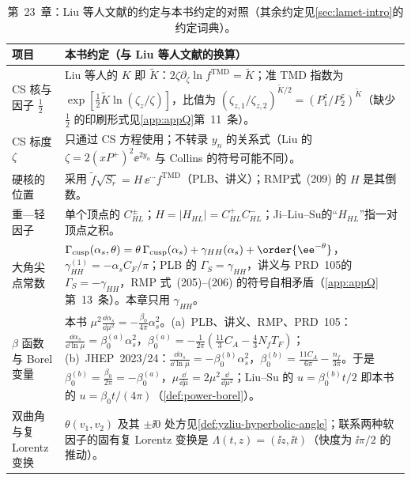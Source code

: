 \begin{table}[htbp]
\centering
\footnotesize
\renewcommand{\arraystretch}{1.1}
\begin{tabularx}{\textwidth}{@{}>{\raggedright\arraybackslash}p{2.0cm}>{\raggedright\arraybackslash}X@{}}
\toprule
项目 & 本书约定（与 Liu 等人文献的换算） \\
\midrule
CS 核与因子 $\frac12$ & Liu 等人的 $K$ 即 $\tilde K$：$2\zeta\partial_\zeta\ln f^{\mathrm{TMD}}=\tilde K$；准 TMD 指数为 $\exp[\frac12\tilde K\ln(\zeta_z/\zeta)]$，比值为 $(\zeta_{z,1}/\zeta_{z,2})^{\tilde K/2}=(P^z_1/P^z_2)^{\tilde K}$（缺少 $\frac12$ 的印刷形式见\cref{app:appQ}第~11~条）。 \\
CS 标度 $\zeta$ & 只通过 CS 方程使用；不转录 $y_n$ 的关系式（Liu 的 $\zeta=2(xP^+)^2\ee^{2y_n}$ 与 Collins 的符号可能不同）。 \\
硬核的位置 & 采用 $\tilde f\sqrt{S_r}=H\,\ee^{\cdots}f^{\mathrm{TMD}}$（PLB\cite{Ji:2019ewn}、讲义\cite{Liu:2022nnk}）；RMP\cite{JiEtAl2021}式~(209) 的 $H$ 是其倒数。 \\
重—轻因子 & 单个顶点的 $C^\pm_{HL}$；$H=|H_{HL}|=C^+_{HL}C^-_{HL}$；Ji--Liu--Su\cite{Ji:2023pba}的“$H_{HL}$”指一对顶点之积。 \\
大角尖点常数 & $\Gamma_{\mathrm{cusp}}(\alpha_s,\theta)=\theta\,\Gamma_{\mathrm{cusp}}(\alpha_s)+\gamma_{HH}(\alpha_s)+\order{\ee^{-\theta}}$，$\gamma_{HH}^{(1)}=-\alpha_sC_F/\pi$；PLB 的 $\Gamma_S=\gamma_{HH}$，讲义与 PRD~105\cite{Ji:2021znw}的 $\Gamma_S=-\gamma_{HH}$，RMP 式~(205)--(206) 的符号自相矛盾（\cref{app:appQ}第~13~条）。本章只用 $\gamma_{HH}$。 \\
$\beta$ 函数与 Borel 变量 & 本书 $\mu^2\frac{\dd\alpha_s}{\dd\mu^2}=-\frac{\beta_0}{4\pi}\alpha_s^2$。(a)~PLB、讲义、RMP、PRD~105：$\frac{\dd\alpha_s}{\dd\ln\mu}=\beta_0^{(a)}\alpha_s^2$，$\beta_0^{(a)}=-\frac{1}{2\pi}(\frac{11}{3}C_A-\frac43N_fT_F)$；(b)~JHEP~2023/24\cite{Ji:2023pba,Liu:2023onm}：$\frac{\dd\alpha_s}{\dd\ln\mu}=-\beta_0^{(b)}\alpha_s^2$，$\beta_0^{(b)}=\frac{11C_A}{6\pi}-\frac{n_f}{3\pi}$。于是 $\beta_0^{(b)}=\frac{\beta_0}{2\pi}=-\beta_0^{(a)}$，$\mu\frac{\dd}{\dd\mu}=2\mu^2\frac{\dd}{\dd\mu^2}$；Liu--Su 的 $u=\beta_0^{(b)}t/2$ 即本书的 $u=\beta_0t/(4\pi)$（\cref{def:power-borel}）。 \\
双曲角与复 Lorentz 变换 & $\theta(v_1,v_2)$ 及其 $\pm\ii0$ 处方见\cref{def:yzliu-hyperbolic-angle}；联系两种软因子的固有复 Lorentz 变换是 $\Lambda(t,z)=(\ii z,\ii t)$（快度为 $\ii\pi/2$ 的推动）。 \\
\bottomrule
\end{tabularx}
\caption{第~23~章：Liu 等人文献的约定与本书约定的对照（其余约定见\cref{sec:lamet-intro}的约定词典）。}
\label{tab:yzliu-conventions}
\end{table}

